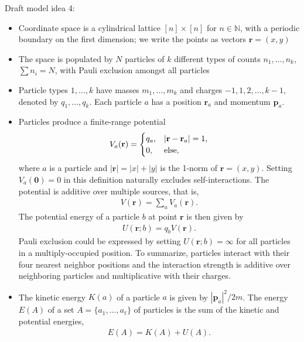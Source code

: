 \documentclass[12pt,letterpaper]{article}
\newcommand{\mb}{\mathbf}
\begin{document}
Draft model idea 4:
\begin{itemize}
\item Coordinate space is a cylindrical lattice $[n] \times [n]$ for $n \in \mathbb{N}$, with a periodic boundary on the first dimension; we write the points as vectors $\mb{r} = (x, y)$
\item The space is populated by $N$ particles of $k$ different types of counts $n_{1}, \ldots, n_{k}$, $\sum n_{i} = N$, with Pauli exclusion amongst all particles
\item Particle types $1, \ldots, k$ have masses $m_{1}, \ldots, m_{k}$ and charges $-1, 1, 2, \ldots, k-1$, denoted by $q_{1}, \ldots, q_{k}$. Each particle $a$ has a position $\mb{r}_{a}$ and momentum $\mb{p}_{a}$.
\item Particles produce a finite-range potential
\begin{align*}
V_{a}(\mb{r}) = \begin{cases}
q_{a}, &|\mb{r} - \mb{r}_{a}| = 1, \\
0, &\textnormal{else},
\end{cases}
\end{align*}
where $a$ is a particle and $|\mb{r}| = |x| + |y|$ is the 1-norm of $\mb{r} = (x, y)$. Setting $V_{a}(\mb{0}) = 0$ in this definition naturally excludes self-interactions. The potential is additive over multiple sources, that is,
\begin{align*}
V(\mb{r}) = \sum_{a}V_{a}(\mb{r}).
\end{align*}
The potential energy of a particle $b$ at point $\mb{r}$ is then given by
\begin{align*}
U(\mb{r}; b) = q_{b}V(\mb{r}).
\end{align*}
Pauli exclusion could be expressed by setting $U(\mb{r}; b) = \infty$ for all particles in a multiply-occupied position. To summarize, particles interact with their four nearest neighbor positions and the interaction strength is additive over neighboring particles and multiplicative with their charges.
\item The kinetic energy $K(a)$ of a particle $a$ is given by $|\mb{p}_{a}|^{2}/2m$. The energy $E(A)$ of a set $A = \{a_{1}, \ldots, a_{\ell}\}$ of particles is the sum of the kinetic and potential energies,
\begin{align*}
E(A) = K(A) + U(A).
\end{align*}

\end{itemize}
\end{document}
